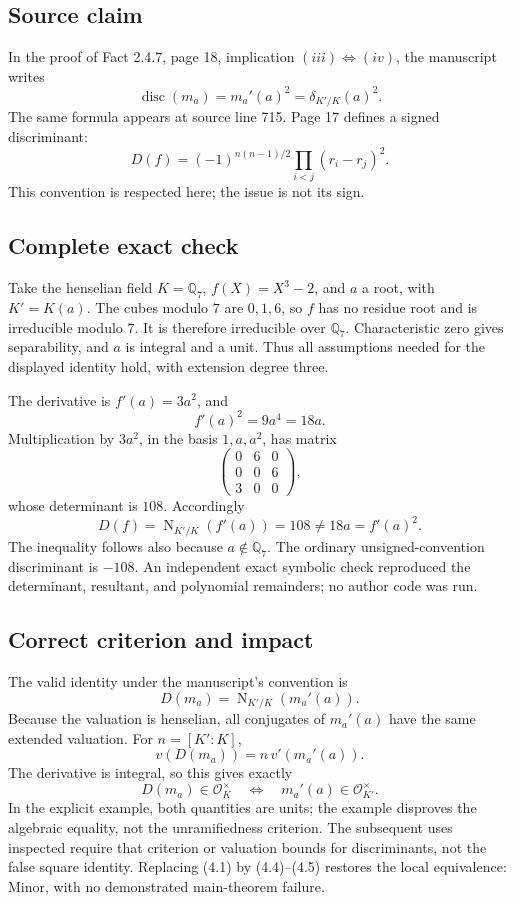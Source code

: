 \documentclass[10pt]{article}
\begin{document}
\subsection*{Source claim}
In the proof of Fact 2.4.7, page 18, implication \((iii)\Leftrightarrow(iv)\), the manuscript writes \[\operatorname{disc}(m_a)=m_a'(a)^2=\delta_{K'/K}(a)^2.
 \tag{4.1}\] The same formula appears at source line 715. Page 17 defines a signed discriminant: \[D(f)=(-1)^{n(n-1)/2}\prod_{i<j}(r_i-r_j)^2.\] This convention is respected here; the issue is not its sign.\par
\subsection*{Complete exact check}
Take the henselian field \(K=\mathbb Q_7\), \(f(X)=X^3-2\), and \(a\) a root, with \(K'=K(a)\). The cubes modulo \(7\) are \(0,1,6\), so \(f\) has no residue root and is irreducible modulo \(7\). It is therefore irreducible over \(\mathbb Q_7\). Characteristic zero gives separability, and \(a\) is integral and a unit. Thus all assumptions needed for the displayed identity hold, with extension degree three.\par
The derivative is \(f'(a)=3a^2\), and \[f'(a)^2=9a^4=18a.
 \tag{4.2}\] Multiplication by \(3a^2\), in the basis \(1,a,a^2\), has matrix \[\begin{pmatrix}0&6&0\\0&0&6\\3&0&0\end{pmatrix},\] whose determinant is \(108\). Accordingly \[D(f)=\operatorname{N}_{K'/K}(f'(a))=108\neq18a=f'(a)^2.
 \tag{4.3}\] The inequality follows also because \(a\notin\mathbb Q_7\). The ordinary unsigned-convention discriminant is \(-108\). An independent exact symbolic check reproduced the determinant, resultant, and polynomial remainders; no author code was run.\par
\subsection*{Correct criterion and impact}
The valid identity under the manuscript’s convention is \[D(m_a)=\operatorname{N}_{K'/K}(m_a'(a)).
 \tag{4.4}\] Because the valuation is henselian, all conjugates of \(m_a'(a)\) have the same extended valuation. For \(n=[K':K]\), \[v(D(m_a))=n\,v'(m_a'(a)).
 \tag{4.5}\] The derivative is integral, so this gives exactly \[D(m_a)\in\mathcal O_K^\times
 \quad\Longleftrightarrow\quad
 m_a'(a)\in\mathcal O_{K'}^\times.\] In the explicit example, both quantities are units; the example disproves the algebraic equality, not the unramifiedness criterion. The subsequent uses inspected require that criterion or valuation bounds for discriminants, not the false square identity. Replacing (4.1) by (4.4)–(4.5) restores the local equivalence: Minor, with no demonstrated main-theorem failure.\par
\end{document}
